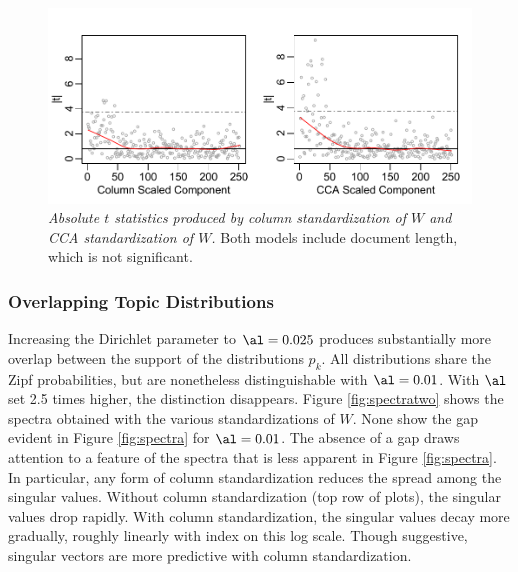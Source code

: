 \documentclass[12pt]{article}
\begin{document}
\begin{figure}
\caption{ \label{fig:ccawins} 
{ \sl Absolute $t$ statistics produced by column standardization of $W$ and CCA standardization of $W$.}
  Both models include document length, which is not significant.}
 \centerline{
 \vspace{0.1in}
 \includegraphics[width=6.0in]{figures/ccawins} }
 \end{figure}

 
 \subsubsection{Overlapping Topic Distributions} %
 
Increasing the Dirichlet parameter to $\al=0.025$ produces substantially more overlap between the support of the distributions $p_k$.  All distributions share the Zipf probabilities, but are nonetheless distinguishable with $\al=0.01$.  With $\al$ set 2.5 times higher, the distinction disappears.  Figure \ref{fig:spectratwo} shows the spectra obtained with the various standardizations of $W$.  None show the gap evident in Figure \ref{fig:spectra} for $\al=0.01$.  The absence of a gap draws attention to a feature of the spectra that is less apparent in Figure \ref{fig:spectra}.  In particular, any form of column standardization reduces the spread among the singular values.  Without column standardization (top row of plots), the singular values drop rapidly.  With column standardization, the singular values decay more gradually, roughly linearly with index on this log scale.  Though suggestive, singular vectors are more predictive with column standardization.
\end{document}
